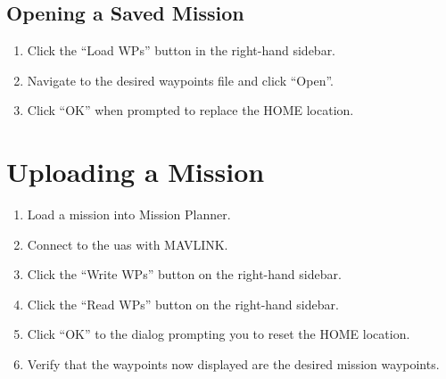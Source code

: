 \documentclass{report}
\begin{document}
		\subsection{Opening a Saved Mission}
			\begin{enumerate}
				\item Click the ``Load WPs'' button in the right-hand sidebar.
				\item Navigate to the desired waypoints file and click ``Open''.
				\item Click ``OK'' when prompted to replace the HOME location.
			\end{enumerate}
	\section{Uploading a Mission}
		\begin{enumerate}
			\item Load a mission into Mission Planner.
			\item Connect to the \gls{uas} with MAVLINK.
			\item Click the ``Write WPs'' button on the right-hand sidebar.
			\item Click the ``Read WPs'' button on the right-hand sidebar.
			\item Click ``OK'' to the dialog prompting you to reset the HOME location.
			\item Verify that the waypoints now displayed are the desired mission waypoints.
		\end{enumerate}
\end{document}
